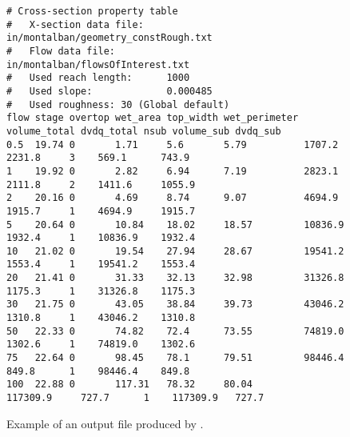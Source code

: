\begin{sidewaysfigure*}
{\small
\begin{lstlisting}[style=txt]
# Cross-section property table          
#   X-section data file:    in/montalban/geometry_constRough.txt          
#   Flow data file:         in/montalban/flowsOfInterest.txt          
#   Used reach length:      1000          
#   Used slope:             0.000485          
#   Used roughness: 30 (Global default)          
flow stage overtop wet_area top_width wet_perimeter volume_total dvdq_total nsub volume_sub dvdq_sub
0.5  19.74 0       1.71     5.6       5.79          1707.2       2231.8     3    569.1      743.9
1    19.92 0       2.82     6.94      7.19          2823.1       2111.8     2    1411.6     1055.9
2    20.16 0       4.69     8.74      9.07          4694.9       1915.7     1    4694.9     1915.7
5    20.64 0       10.84    18.02     18.57         10836.9      1932.4     1    10836.9    1932.4
10   21.02 0       19.54    27.94     28.67         19541.2      1553.4     1    19541.2    1553.4
20   21.41 0       31.33    32.13     32.98         31326.8      1175.3     1    31326.8    1175.3
30   21.75 0       43.05    38.84     39.73         43046.2      1310.8     1    43046.2    1310.8
50   22.33 0       74.82    72.4      73.55         74819.0      1302.6     1    74819.0    1302.6
75   22.64 0       98.45    78.1      79.51         98446.4      849.8      1    98446.4    849.8
100  22.88 0       117.31   78.32     80.04         117309.9     727.7      1    117309.9   727.7
\end{lstlisting}
}
  \caption{Example of an output file produced by . \label{fig:xsanalyzer:output}}
\end{sidewaysfigure*}

